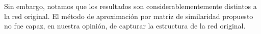 Sin embargo, notamos que los resultados son considerablementemente distintos a la red original. El método de aproximación por matriz de similaridad propuesto no fue capaz, en nuestra opinión, de capturar la estructura de la red original. 






